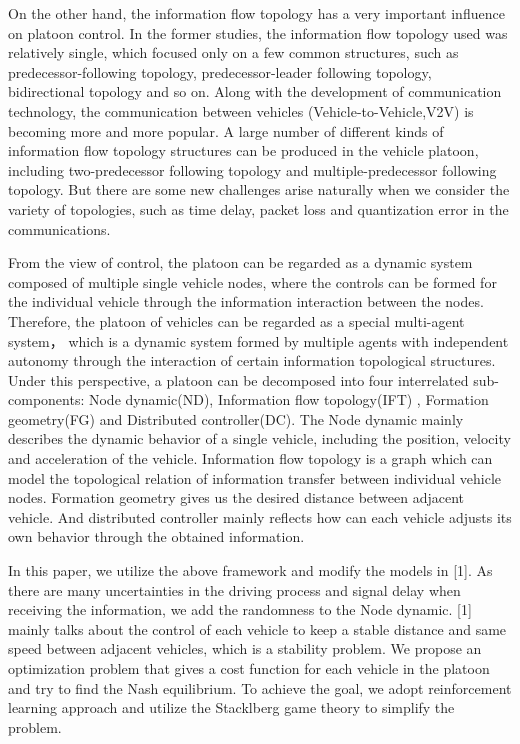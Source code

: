 \documentclass{article}
\begin{document}
On the other hand, the information flow topology has a very important influence on platoon control. In the former studies, the information flow topology used was relatively single, which focused only on a few common structures, such as predecessor-following topology, predecessor-leader following topology, bidirectional topology and so on.  Along with the development of communication technology, the communication between vehicles (Vehicle-to-Vehicle,V2V) is becoming more and more popular. A large number of different kinds of information flow topology structures can be produced in the vehicle platoon, including two-predecessor following topology and multiple-predecessor following topology. But there are some new challenges arise naturally when we consider the variety of topologies, such as time delay, packet loss and quantization error in the communications.

From the view of control, the platoon can be regarded as a dynamic system composed of multiple single vehicle nodes, where the controls can be formed for the individual vehicle through the information interaction between the nodes. Therefore, the platoon of vehicles can be regarded as a special multi-agent system， which is a dynamic system formed by multiple agents with independent autonomy through the interaction of certain information topological structures. Under this perspective, a platoon can be decomposed into four interrelated sub-components: Node dynamic(ND), Information flow topology(IFT) , Formation geometry(FG) and Distributed controller(DC). The Node dynamic mainly describes the dynamic behavior of a single vehicle, including the position, velocity and acceleration of the vehicle.  Information flow topology is a graph which can model the topological relation of information transfer between individual vehicle nodes. Formation geometry gives us the desired distance between adjacent vehicle. And distributed controller mainly reflects how can each vehicle adjusts its own behavior through the obtained information.

In this paper, we utilize the above framework and modify the models in [1]. As there are many uncertainties in the driving process and signal delay when receiving the information, we add the randomness to the Node dynamic. [1] mainly talks about the control of each vehicle to keep a stable distance and same speed between adjacent vehicles, which is a stability problem. We propose an optimization problem that gives a cost function for each vehicle in the platoon and try to find the Nash equilibrium. To achieve the goal, we adopt reinforcement learning approach and utilize the Stacklberg game theory to simplify the problem.
\end{document}
